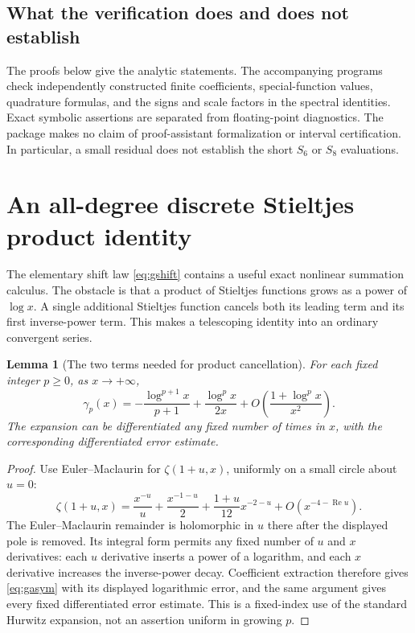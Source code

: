 \documentclass[11pt,letterpaper]{article}
\numberwithin{equation}{section}
\theoremstyle{plain}
\newtheorem{lemma}[theorem]{Lemma}
\theoremstyle{definition}
\theoremstyle{remark}
\DeclareMathOperator{\Rea}{Re}
\begin{document}
\subsection{What the verification does and does not establish}

The proofs below give the analytic statements. The accompanying programs
check independently constructed finite coefficients, special-function
values, quadrature formulas, and the signs and scale factors in the
spectral identities. Exact symbolic assertions are separated from
floating-point diagnostics. The package makes no claim of proof-assistant
formalization or interval certification. In particular, a small residual
does not establish the short $S_6$ or $S_8$ evaluations.

\section{An all-degree discrete Stieltjes product identity}\label{sec:discrete}

The elementary shift law \eqref{eq:gshift} contains a useful exact
nonlinear summation calculus. The obstacle is that a product of Stieltjes
functions grows as a power of $\log x$. A single additional Stieltjes
function cancels both its leading term and its first inverse-power term.
This makes a telescoping identity into an ordinary convergent series.

\begin{lemma}[The two terms needed for product cancellation]\label{lem:gasym}
For each fixed integer $p\ge0$, as $x\to+\infty$,
\begin{equation}\label{eq:gasym}
 \gamma_p(x)=-\frac{\log^{p+1}x}{p+1}
       +\frac{\log^p x}{2x}
       +O\left(\frac{1+\log^p x}{x^2}\right).
\end{equation}
The expansion can be differentiated any fixed number of times in $x$,
with the corresponding differentiated error estimate.
\end{lemma}
\begin{proof}
Use Euler--Maclaurin for $\zeta(1+u,x)$, uniformly on a small circle
about $u=0$:
\[
 \zeta(1+u,x)=\frac{x^{-u}}u+
 \frac{x^{-1-u}}2+\frac{1+u}{12}x^{-2-u}
 +O(x^{-4-\Rea u}).
\]
The Euler--Maclaurin remainder is holomorphic in $u$ there after the
displayed pole is removed. Its integral form permits any fixed number
of $u$ and $x$ derivatives: each $u$ derivative inserts a power of a
logarithm, and each $x$ derivative increases the inverse-power decay.
Coefficient extraction therefore gives \eqref{eq:gasym} with its
displayed logarithmic error, and the same argument gives every fixed
differentiated error estimate. This is a fixed-index use of the standard
Hurwitz expansion, not an assertion uniform in growing $p$.
\end{proof}
\end{document}
